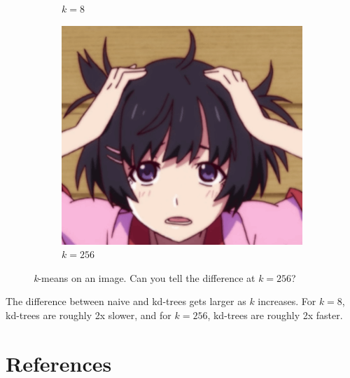 \documentclass{beamer}                             %
\begin{document}
\begin{frame}
\begin{figure}[h!]
\begin{subfigure}[h]{0.3 \textwidth}
      \caption{\(k = 8 \)}
    \end{subfigure}
    \hfill
    \begin{subfigure}[h]{0.3 \textwidth}
      \includegraphics[scale=0.17]{hanekawa256.png}
      \caption{\( k = 256 \)}
    \end{subfigure}
    \caption{\textit{k}-means on an image. Can you tell the difference
    at \( k = 256 \)?}
\end{figure}
The difference between naive and kd-trees gets larger as \( k \) increases.
For \( k = 8 \), kd-trees are roughly 2x slower, and for \( k = 256 \),
kd-trees are roughly 2x faster.
\end{frame}

\section{References}
\end{document}
